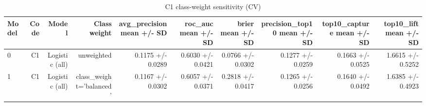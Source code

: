 \begin{table}[htbp]
\centering
\small
\caption{C1 class-weight sensitivity (CV)}
\begin{tabular}{lrrrrrrrrr}
\toprule
Model & Code & Model & Class weight & avg\_precision mean +/- SD & roc\_auc mean +/- SD & brier mean +/- SD & precision\_top10 mean +/- SD & top10\_capture mean +/- SD & top10\_lift mean +/- SD \\
\midrule
0 & C1 & Logistic (all) & unweighted & 0.1175 +/- 0.0289 & 0.6030 +/- 0.0421 & 0.0766 +/- 0.0302 & 0.1277 +/- 0.0259 & 0.1663 +/- 0.0525 & 1.6615 +/- 0.5252 \\
1 & C1 & Logistic (all) & class\_weight='balanced' & 0.1167 +/- 0.0302 & 0.6057 +/- 0.0371 & 0.2818 +/- 0.0417 & 0.1265 +/- 0.0256 & 0.1640 +/- 0.0492 & 1.6385 +/- 0.4923 \\
\bottomrule
\end{tabular}
\par\smallskip\begin{minipage}{\linewidth}\footnotesize \end{minipage}
\end{table}

